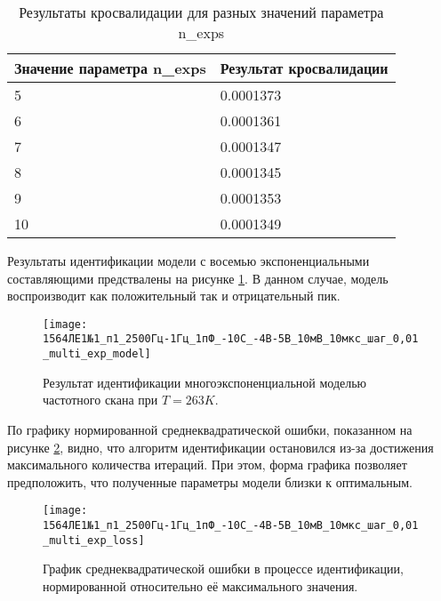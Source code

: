 	\begin{table}[!htp]
    	\centering
    	\caption{Результаты кросвалидации для разных значений параметра n\_exps}
		\begin{tabular}{|l|l|}
		\hline
		Значение параметра n\_exps & Результат кросвалидации \\ \hline
		5                          & 0.0001373               \\ \hline
		6                          & 0.0001361               \\ \hline
		7                          & 0.0001347               \\ \hline
		8                          & 0.0001345               \\ \hline
		9                          & 0.0001353               \\ \hline
		10                         & 0.0001349               \\ \hline
		\end{tabular}
		\label{table:multi_exp_model_263_cross_val}
	\end{table}

	Результаты идентификации модели с восемью экспоненциальными составляющими
	предствалены на рисунке \ref{pic:multi_exp_model_263}. В данном случае,
	модель воспроизводит как положительный так и отрицательный пик.

	\begin{figure}[!htp]
		\centering
		\texttt{[image: 1564ЛЕ1№1\_п1\_2500Гц-1Гц\_1пФ\_-10С\_-4В-5В\_10мВ\_10мкс\_шаг\_0,01\_multi\_exp\_model]}
		\caption{Результат идентификации многоэкспоненциальной моделью 
		         частотного скана при $T=263K$.}
		\label{pic:multi_exp_model_263}
	\end{figure}

	По графику нормированной среднеквадратической ошибки, показанном на рисунке
	\ref{pic:multi_exp_loss_263}, видно, что алгоритм идентификации остановился
	из-за достижения максимального количества итераций. При этом, форма графика
	позволяет предположить, что полученные параметры модели близки к оптимальным.

	\begin{figure}[!htp]
		\centering
		\texttt{[image: 1564ЛЕ1№1\_п1\_2500Гц-1Гц\_1пФ\_-10С\_-4В-5В\_10мВ\_10мкс\_шаг\_0,01\_multi\_exp\_loss]}
		\caption{График среднеквадратической ошибки в процессе идентификации,
		         нормированной относительно её максимального значения.}
		\label{pic:multi_exp_loss_263}
	\end{figure}

